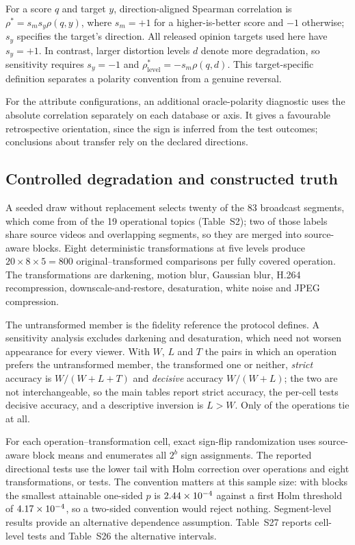 For a score $q$ and target $y$, direction-aligned Spearman correlation is $\rho^*=s_m s_y\rho(q,y)$, where $s_m=+1$ for a higher-is-better score and $-1$ otherwise; $s_y$ specifies the target's direction. All released opinion targets used here have $s_y=+1$. In contrast, larger distortion levels $d$ denote more degradation, so sensitivity requires $s_y=-1$ and $\rho^*_{\mathrm{level}}=-s_m\rho(q,d)$. This target-specific definition separates a polarity convention from a genuine reversal.

For the \resCombinacoes{} attribute configurations, an additional oracle-polarity diagnostic uses the absolute correlation separately on each database or axis. It gives a favourable retrospective orientation, since the sign is inferred from the test outcomes; conclusions about transfer rely on the declared directions.

\subsection{Controlled degradation and constructed truth}\label{sec:controlled}

A seeded draw without replacement selects twenty of the 83 broadcast segments, which come from \invRotulos{} of the 19 operational topics (Table~S2); two of those labels share source videos and overlapping segments, so they are merged into \invBlocosN{} source-aware blocks. Eight deterministic transformations at five levels produce $20\times8\times5=800$ original--transformed comparisons per fully covered operation. The transformations are darkening, motion blur, Gaussian blur, H.264 recompression, downscale-and-restore, desaturation, white noise and JPEG compression.

The untransformed member is the fidelity reference the protocol defines. A sensitivity analysis excludes darkening and desaturation, which need not worsen appearance for every viewer. With $W$, $L$ and $T$ the pairs in which an operation prefers the untransformed member, the transformed one or neither, \emph{strict} accuracy is $W/(W+L+T)$ and \emph{decisive} accuracy $W/(W+L)$; the two are not interchangeable, so the main tables report strict accuracy, the per-cell tests decisive accuracy, and a descriptive inversion is $L>W$. Only \empOps{} of the \fontesDaLiteratura{} operations tie at all.

For each operation--transformation cell, exact sign-flip randomization uses source-aware block means and enumerates all $2^b$ sign assignments. The reported directional tests use the lower tail with Holm correction over \fontesDaLiteratura{} operations and eight transformations, or \invTestes{} tests. The convention matters at this sample size: with \invBlocosN{} blocks the smallest attainable one-sided $p$ is $2.44\times 10^{-4}{}$ against a first Holm threshold of $4.17\times 10^{-4}{}$, so a two-sided convention would reject nothing. Segment-level results provide an alternative dependence assumption. Table~S27 reports cell-level tests and Table~S26 the alternative intervals.

